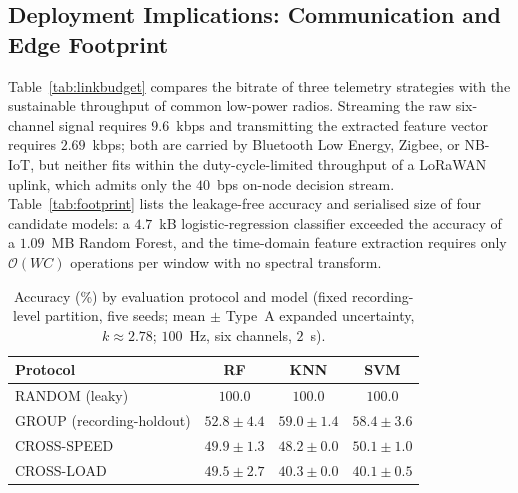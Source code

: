 \subsection{Deployment Implications: Communication and Edge Footprint}
\label{subsec:edge}
Table~\ref{tab:linkbudget} compares the bitrate of three telemetry strategies
with the sustainable throughput of common low-power radios. Streaming the raw
six-channel signal requires $9.6$~kbps and transmitting the extracted feature
vector requires $2.69$~kbps; both are carried by Bluetooth Low Energy, Zigbee, or
NB-IoT, but neither fits within the duty-cycle-limited throughput of a LoRaWAN
uplink, which admits only the $40$~bps on-node decision stream.
Table~\ref{tab:footprint} lists the leakage-free accuracy and serialised size of
four candidate models: a $4.7$~kB logistic-regression classifier exceeded the
accuracy of a $1.09$~MB Random Forest, and the time-domain feature extraction
requires only $\mathcal{O}(WC)$ operations per window with no spectral transform.

\begin{table}[t]
\centering
\caption{Accuracy (\%) by evaluation protocol and model (fixed recording-level
partition, five seeds; mean $\pm$ Type~A expanded uncertainty, $k\approx2.78$;
$100$~Hz, six channels, $2$~s).}
\label{tab:optimism}
\renewcommand{\arraystretch}{1.2}
\begin{tabular}{@{}lccc@{}}
\toprule
\textbf{Protocol} & \textbf{RF} & \textbf{KNN} & \textbf{SVM} \\
\midrule
RANDOM (leaky)            & $100.0$ & $100.0$ & $100.0$ \\
GROUP (recording-holdout) & $52.8\pm4.4$ & $59.0\pm1.4$ & $58.4\pm3.6$ \\
CROSS-SPEED               & $49.9\pm1.3$ & $48.2\pm0.0$ & $50.1\pm1.0$ \\
CROSS-LOAD                & $49.5\pm2.7$ & $40.3\pm0.0$ & $40.1\pm0.5$ \\
\bottomrule
\end{tabular}
\end{table}

